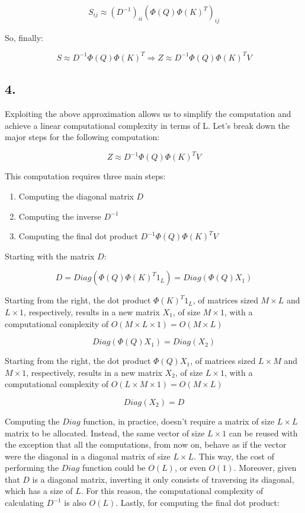 \documentclass[11pt]{article}
\begin{document}
\[
    S_{ij} \approx (D^{-1})_{ii} {(\Phi(Q) \Phi(K)^T)_{ij}}
\]

So, finally:

\[
    S \approx D^{-1} \Phi(Q) \Phi(K)^T \Rightarrow Z \approx D^{-1} \Phi(Q) \Phi(K)^T V
\]

\subsection*{4.}

Exploiting the above approximation allows us to simplify the computation and achieve a linear computational complexity in terms of L. Let's break down the major steps for the following computation:

\[
    Z \approx D^{-1} \Phi(Q) \Phi(K)^T V
\]


This computation requires three main steps:

\begin{enumerate}
    \item Computing the diagonal matrix $D$
    \item Computing the inverse $D^{-1}$
    \item Computing the final dot product $D^{-1} \Phi(Q) \Phi(K)^T V$
\end{enumerate}

Starting with the matrix $D$:

\[
    D = Diag(\Phi(Q) \Phi(K)^T 1_L) = Diag(\Phi(Q) X_1)
\]

Starting from the right, the dot product $\Phi(K)^T 1_L$, of matrices sized $M \times L$ and $L \times 1$, respectively, results in a new matrix $X_{1}$, of size $M\times 1$, with a computational complexity of $O(M \times L \times 1) = O(M\times L)$

\[
    Diag(\Phi(Q) X_1) = Diag(X_2)
\]

Starting from the right, the dot product $\Phi(Q) X_1$, of matrices sized $L\times M$ and $M\times 1$, respectively, results in a new matrix $X_{2}$, of size $L \times 1$, with a computational complexity of $O(L\times M \times 1) = O(M\times L)$

\[
    Diag(X_2 ) = D
\]

Computing the $Diag$ function, in practice, doesn't require a matrix of size $L \times L$ matrix to be allocated. Instead, the same vector of size $L \times 1$ can be reused with the exception that all the computations, from now on, behave as if the vector were the diagonal in a diagonal matrix of size $L \times L$. This way, the cost of performing the $Diag$ function could be $O(L)$, or even $O(1)$. Moreover, given that $D$ is a diagonal matrix, inverting it only consists of traversing its diagonal, which has a size of $L$. For this reason, the computational complexity of calculating $D^{-1}$ is also $O(L)$. Lastly, for computing the final dot product:
\end{document}
